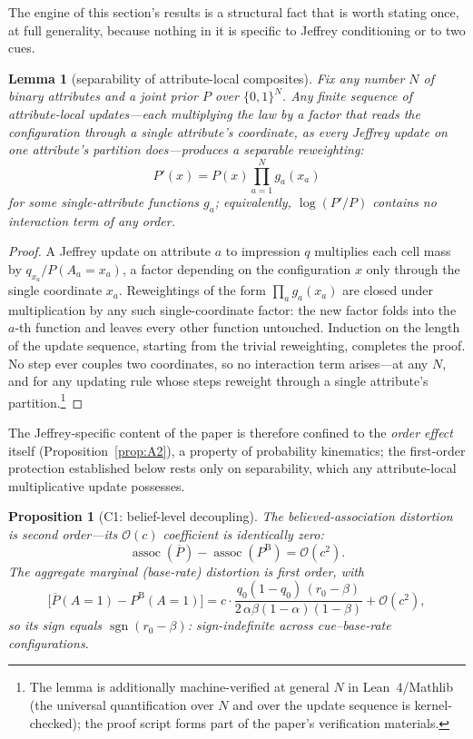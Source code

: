 \documentclass[review,12pt,authoryear]{elsarticle}
\newtheorem{proposition}{Proposition}
\newtheorem{lemma}{Lemma}
\theoremstyle{remark}
\theoremstyle{definition}
\newcommand{\PB}{P^{\mathrm{B}}}
\newcommand{\Pbar}{\overline{P}}
\newcommand{\assoc}{\operatorname{assoc}}
\newcommand{\sgn}{\operatorname{sgn}}
\newcommand{\bigO}{\mathcal{O}}
\newcommand{\anchor}[1]{}
\begin{document}
The engine of this section's results is a structural fact that is worth stating once, at full
generality, because nothing in it is specific to Jeffrey conditioning or to two cues.

\begin{lemma}[separability of attribute-local composites]\label{lem:sep}
Fix any number $N$ of binary attributes and a joint prior $P$ over $\{0,1\}^{N}$. Any finite
sequence of attribute-local updates---each multiplying the law by a factor that reads the
configuration through a single attribute's coordinate, as every Jeffrey update on one
attribute's partition does---produces a \emph{separable} reweighting:
\[
  P'(x)=P(x)\prod_{a=1}^{N}g_{a}(x_{a})
\]
for some single-attribute functions $g_{a}$; equivalently, $\log(P'/P)$ contains no interaction
term of any order. \anchor{Lem.~SEP}
\end{lemma}

\begin{proof}
A Jeffrey update on attribute $a$ to impression $q$ multiplies each cell mass by
$q_{x_a}/P(A_a{=}x_a)$, a factor depending on the configuration $x$ only through the single
coordinate $x_{a}$. Reweightings of the form $\prod_{a}g_{a}(x_{a})$ are closed under
multiplication by any such single-coordinate factor: the new factor folds into the $a$-th
function and leaves every other function untouched. Induction on the length of the update
sequence, starting from the trivial reweighting, completes the proof. No step ever couples two
coordinates, so no interaction term arises---at any $N$, and for any updating rule whose steps
reweight through a single attribute's partition.\footnote{The lemma is additionally
machine-verified at general $N$ in Lean~4/Mathlib (the universal quantification over $N$ and
over the update sequence is kernel-checked); the proof script forms part of the paper's
verification materials.}
\end{proof}

The Jeffrey-specific content of the paper is therefore confined to the \emph{order effect}
itself (Proposition~\ref{prop:A2}), a property of probability kinematics; the first-order
protection established below rests only on separability, which any attribute-local
multiplicative update possesses.

\begin{proposition}[C1: belief-level decoupling]\label{prop:C1}
The believed-association distortion is second order---its $\bigO(c)$ coefficient is identically
zero:
\[
  \assoc(\Pbar)-\assoc(\PB)=\bigO(c^{2}).
\]
The aggregate \emph{marginal} (base-rate) distortion is first order, with
\[
  \big[\Pbar(A{=}1)-\PB(A{=}1)\big]
   = c\cdot\frac{q_0(1-q_0)\,(r_0-\beta)}{2\,\alpha\beta(1-\alpha)(1-\beta)}+\bigO(c^2),
\]
so its sign equals $\sgn(r_0-\beta)$: sign-indefinite across cue--base-rate configurations.
\anchor{Prop.~C1}
\end{proposition}
\end{document}
